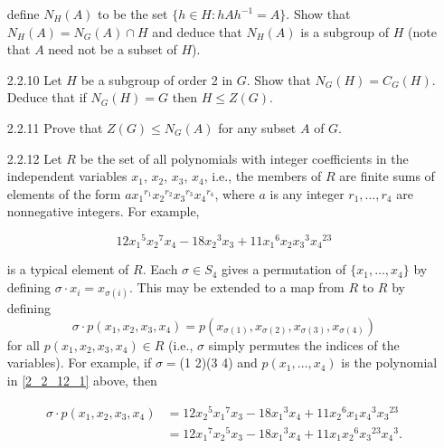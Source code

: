 \begin{enumerate}
                  define $N_H(A)$ to be the set $\{h \in H : hAh^{-1} = A\}$.
                  Show that $N_H(A) = N_G(A) \cap H$ and deduce that $N_H(A)$ is
                  a subgroup of $H$ (note that $A$ need not be a subset of $H$).
   \item[2.2.10]  Let $H$ be a subgroup of order 2 in $G$. Show that
                  $N_G(H) = C_G(H)$. Deduce that if $N_G(H) = G$ then
                  $H \le Z(G)$.
   \item[2.2.11]  Prove that $Z(G) \le N_G(A)$ for any subset $A$ of $G$.
   \item[2.2.12]  Let $R$ be the set of all polynomials with integer
                  coefficients in the independent variables $x_1$, $x_2$, $x_3$,
                  $x_4$, i.e., the members of $R$ are finite sums of elements of
                  the form ${ax_1}^{r_1}{x_2}^{r_2}{x_3}^{r_3}{x_4}^{r_4}$,
                  where $a$ is any integer $r_1, \ldots, r_4$ are nonnegative
                  integers. For example,

                  \begin{equation} \label{2_2_12_1}
                     12{x_1}^5{x_2}^7x_4 - 18{x_2}^3x_3 +
                        11{x_1}^6x_2{x_3}^3{x_4}^{23}
                  \end{equation}

                  is a typical element of $R$. Each $\sigma \in S_4$ gives a
                  permutation of $\{x_1, \ldots, x_4\}$ by defining
                  $\sigma \cdot x_i = x_{\sigma(i)}$. This may be extended to a
                  map from $R$ to $R$ by defining
                  $$\sigma \cdot p(x_1, x_2, x_3, x_4) = p(x_{\sigma(1)},
                    x_{\sigma(2)}, x_{\sigma(3)}, x_{\sigma(4)})$$
                  for all $p(x_1, x_2, x_3, x_4) \in R$ (i.e., $\sigma$ simply
                  permutes the indices of the variables). For example, if
                  $\sigma =$(1 2)(3 4) and $p(x_1, \ldots, x_4)$ is the
                  polynomial in \eqref{2_2_12_1} above, then

                  \begin{align*}
                     \sigma \cdot p(x_1, x_2, x_3, x_4) &= 12{x_2}^5{x_1}^7x_3 -
                        18{x_1}^3x_4 + 11{x_2}^6x_1{x_4}^3{x_3}^{23} \\
                        &= 12{x_1}^7{x_2}^5x_3 -
                        18{x_1}^3x_4 + 11x_1{x_2}^6{x_3}^{23}{x_4}^3.
                  \end{align*}


\end{enumerate}
